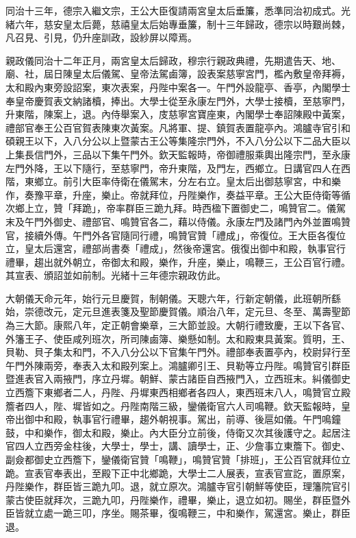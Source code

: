 \begin{pinyinscope}
同治十三年，德宗入繼文宗，王公大臣復請兩宮皇太后垂簾，悉準同治初成式。光緒六年，慈安皇太后薨，慈禧皇太后始專垂簾，制十三年歸政，德宗以時艱尚棘，凡召見、引見，仍升座訓政，設紗屏以障焉。

親政儀同治十二年正月，兩宮皇太后歸政，穆宗行親政典禮，先期遣告天、地、廟、社，屆日陳皇太后儀駕、皇帝法駕鹵簿，設表案慈寧宮門，檻內敷皇帝拜褥，太和殿內東旁設詔案，東次表案，丹陛中案各一。午門外設龍亭、香亭，內閣學士奉皇帝慶賀表文納諸櫝，捧出。大學士從至永康左門外，大學士接櫝，至慈寧門，升東階，陳案上，退。內侍舉案入，庋慈寧宮寶座東，內閣學士奉詔陳殿中黃案，禮部官奉王公百官賀表陳東次黃案。凡將軍、提、鎮賀表置龍亭內。鴻臚寺官引和碩親王以下，入八分公以上暨蒙古王公等集隆宗門外，不入八分公以下二品大臣以上集長信門外，三品以下集午門外。欽天監報時，帝御禮服乘輿出隆宗門，至永康左門外降，王以下隨行，至慈寧門，帝升東階，及門左，西鄉立。日講官四人在西階，東鄉立。前引大臣率侍衛在儀駕末，分左右立。皇太后出御慈寧宮，中和樂作，奏豫平章，升座，樂止。帝就拜位，丹陛樂作，奏益平章。王公大臣侍衛等循次鄉上立，贊「拜跪」，帝率群臣三跪九拜。時西楹下置御史二，鳴贊官二。儀駕末及午門外御史、禮部官、鳴贊官各二，藉以侍儀。永康左門及諸門內外並置鳴贊官，接續外傳。午門外各官隨同行禮，鳴贊官贊「禮成」，帝復位。王大臣各復位立，皇太后還宮，禮部尚書奏「禮成」，然後帝還宮。俄復出御中和殿，執事官行禮畢，趨出就外朝立，帝御太和殿，樂作，升座，樂止，鳴鞭三，王公百官行禮。其宣表、頒詔並如前制。光緒十三年德宗親政仿此。

大朝儀天命元年，始行元旦慶賀，制朝儀。天聰六年，行新定朝儀，此班朝所繇始，崇德改元，定元旦進表箋及聖節慶賀儀。順治八年，定元旦、冬至、萬壽聖節為三大節。康熙八年，定正朝會樂章，三大節並設。大朝行禮致慶，王以下各官、外籓王子、使臣咸列班次，所司陳鹵簿、樂懸如制。太和殿東具黃案。質明，王、貝勒、貝子集太和門，不入八分公以下官集午門外。禮部奉表置亭內，校尉舁行至午門外陳兩旁，奉表入太和殿列案上。鴻臚卿引王、貝勒等立丹陛。鳴贊官引群臣暨進表官入兩掖門，序立丹墀。朝鮮、蒙古諸臣自西掖門入，立西班末。糾儀御史立西簷下東鄉者二人，丹陛、丹墀東西相鄉者各四人，東西班末八人，鳴贊官立殿簷者四人，陛、墀皆如之。丹陛南階三級，鑾儀衛官六人司鳴鞭。欽天監報時，皇帝出御中和殿，執事官行禮畢，趨外朝視事。駕出，前導、後扈如儀。午門鳴鐘鼓，中和樂作，御太和殿，樂止。內大臣分立前後，侍衛又次其後護守之。起居注官四人立西旁金柱後，大學士，學士，講、讀學士，正、少詹事立東簷下。御史、副僉都御史立西簷下，鑾儀衛官贊「鳴鞭」，鳴贊官贊「排班」，王公百官就拜位立跪。宣表官奉表出，至殿下正中北鄉跪，大學士二人展表，宣表官宣訖，置原案，丹陛樂作，群臣皆三跪九叩。退，就立原次。鴻臚寺官引朝鮮等使臣，理籓院官引蒙古使臣就拜次，三跪九叩，丹陛樂作，禮畢，樂止，退立如初。賜坐，群臣暨外臣皆就立處一跪三叩，序坐。賜茶畢，復鳴鞭三，中和樂作，駕還宮。樂止，群臣退。


\end{pinyinscope}
